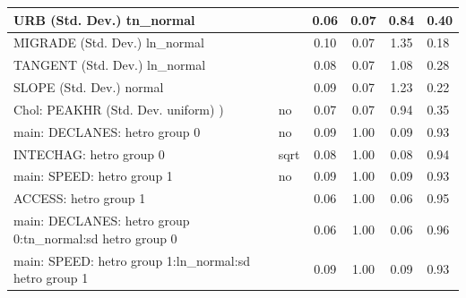 \begin{table}
\begin{center}
\begin{tabular}{|l|l|c|c|c|l|}
			\hline
			URB (Std. Dev.) tn_normal &  & 0.06 & 0.07 & 0.84 & 0.40 \\
			\hline
			MIGRADE (Std. Dev.) ln_normal &  & 0.10 & 0.07 & 1.35 & 0.18 \\
			\hline
			TANGENT (Std. Dev.) ln_normal &  & 0.08 & 0.07 & 1.08 & 0.28 \\
			\hline
			SLOPE (Std. Dev.) normal &  & 0.09 & 0.07 & 1.23 & 0.22 \\
			\hline
			 Chol: PEAKHR (Std. Dev. uniform) ) & no & 0.07 & 0.07 & 0.94 & 0.35 \\
			\hline
			main: DECLANES: hetro group 0 & no & 0.09 & 1.00 & 0.09 & 0.93 \\
			\hline
			INTECHAG: hetro group 0 & sqrt & 0.08 & 1.00 & 0.08 & 0.94 \\
			\hline
			main: SPEED: hetro group 1 & no & 0.09 & 1.00 & 0.09 & 0.93 \\
			\hline
			ACCESS: hetro group 1 &  & 0.06 & 1.00 & 0.06 & 0.95 \\
			\hline
			main: DECLANES: hetro group 0:tn_normal:sd  hetro group 0 &  & 0.06 & 1.00 & 0.06 & 0.96 \\
			\hline
			main: SPEED: hetro group 1:ln_normal:sd  hetro group 1 &  & 0.09 & 1.00 & 0.09 & 0.93 \\
			\hline
		\end{tabular}
	\end{center}
\end{table}